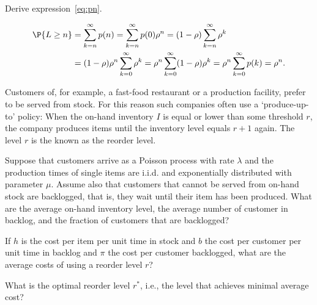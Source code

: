 \begin{question}
  Derive expression~\ref{eq:pn}.
  \begin{solution}
    \begin{equation*}
      \begin{split}
\P{L\geq n} 
&= \sum_{k=n}^\infty p(n) = \sum_{k=n}^\infty p(0)\rho^n = (1-\rho)\sum_{k=n}^\infty \rho^k \\
&= (1-\rho)\rho^n \sum_{k=0}^\infty\rho^k = \rho^n \sum_{k=0}^\infty(1-\rho) \rho^k = \rho^n \sum_{k=0}^\infty p(k)  = \rho^n.
\end{split}
\end{equation*}
\end{solution}
\end{question}

\begin{question}
\label{q:basestock}
Customers of, for example, a fast-food restaurant or a production
facility, prefer to be served from stock. For this reason such
companies often use a `produce-up-to' policy: When the on-hand
inventory $I$ is equal or lower than some threshold $r$, the company
produces items until the inventory level equals $r+1$ again. The level
$r$ is the known as the reorder level.

Suppose that customers arrive as a Poisson process with rate $\lambda$
and the production times of single items are i.i.d. and exponentially
distributed with parameter $\mu$. Assume also that customers that
cannot be served from on-hand stock are backlogged, that is, they wait
until their item has been produced. What are the average on-hand
inventory level, the average number of customer in backlog, and the
fraction of customers that are backlogged?

If $h$ is the cost per item per unit time in stock and $b$ the cost
per customer per unit time in backlog and $\pi$ the cost per customer
backlogged, what are the average costs of using a reorder level $r$? 

What is the optimal reorder level $r^*$, i.e., the level that achieves
minimal average cost?


  \begin{solution}
\tbd
  \end{solution}
\end{question}

